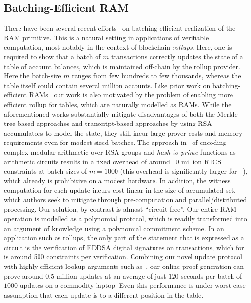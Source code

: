 \subsection{Batching-Efficient RAM}\label{subsec:batching-efficient-ram}
There have been several recent efforts~\cite{USENIX:OWWB20,CCS:CFHKKO22} on batching-efficient
realization of the RAM primitive. This is a natural setting in applications of verifiable
computation, most notably in the context of blockchain {\em rollups}. Here, one is required
to show that a batch of $m$ transactions correctly updates the state of a table of account balances, which
is maintained off-chain by the rollup provider. Here the batch-size $m$ ranges from few hundreds to few
thousands, whereas the table itself could contain several million accounts.
Like prior work on batching-efficient
RAMs~\cite{USENIX:OWWB20,CCS:CFHKKO22} our work is also motivated by the problem of enabling more efficient rollup for tables, which are
naturally modelled as RAMs. While the aforementioned works substantially mitigate disadvantages of both the
Merkle-tree based approaches and transcript-based approaches by using RSA accumulators to model the state,
they still incur large prover costs and memory requirements even for modest sized batches. The approach
in~\cite{USENIX:OWWB20,CCS:CFHKKO22} of encoding complex modular arithmetic over RSA groups and {\em hash
to prime} functions as arithmetic circuits results in a fixed overhead of around $10$ million R1CS constraints
at batch sizes of $m=1000$ (this overhead is significantly larger for ~\cite{USENIX:OWWB20}), which already
is prohibitive on a modest hardware. In addition, the witness computation for each update incurs cost
linear in the size of accumulated set, which authors seek to mitigate through pre-computation and
parallel/distributed processing. Our solution, by contrast is almost ``circuit-free''. Our entire
RAM operation is modelled as a polynomial protocol, which is readily transformed into an argument of
knowledge using a polynomial commitment scheme. In an application such as rollups, the only part of the statement 
that is expressed as a circuit is the verification of EDDSA digital signatures on transactions,
which for is around 500 constraints per verification.
Combining our novel update protocol with highly efficient
lookup arguments such as~\cite{EPRINT:EagFioGab22}, our online proof generation can prove around $0.5$ million
updates at an average of just $120$ seconds per batch of $1000$ updates on a commodity laptop. Even
this performance is under worst-case assumption that each update is to a different position in the table.

